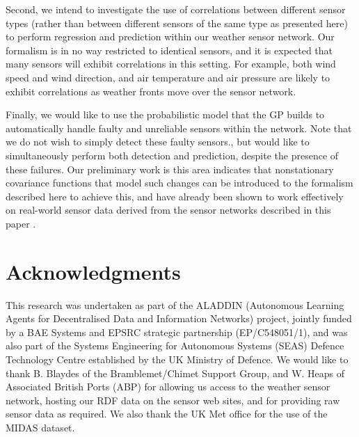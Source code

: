 \documentclass{acmsmall}
\begin{document}
Second, we intend to investigate the use of correlations between different sensor types (rather than between different sensors of the same type as presented here) to perform regression and prediction within our weather sensor network. Our formalism is in no way restricted to identical sensors, and it is expected that many sensors will exhibit correlations in this setting. For example, both wind speed and wind direction, and air temperature and air pressure are likely to exhibit correlations as weather fronts move over the sensor network.

Finally, we would like to use the probabilistic model that the GP builds to automatically handle faulty and unreliable sensors within the network. Note that we do not wish to simply detect these faulty sensors., but would like to simultaneously perform both detection and prediction, despite the presence of these failures. Our preliminary work is this area indicates that nonstationary covariance functions that model such changes can be introduced to the formalism described here to achieve this, and have already been shown to work effectively on real-world sensor data derived from the sensor networks described in this paper \cite{changepoint}.

\section*{Acknowledgments}

\noindent This research was undertaken as part of the ALADDIN (Autonomous Learning Agents for Decentralised Data and Information Networks) project, jointly funded by a BAE Systems and EPSRC strategic partnership (EP/C548051/1), and was also part of the Systems Engineering for Autonomous Systems (SEAS) Defence Technology Centre established by the UK Ministry of Defence. We would like to thank B. Blaydes of the Bramblemet/Chimet Support Group, and W. Heaps of Associated British Ports (ABP) for allowing us access to the weather sensor network, hosting our RDF data on the sensor web sites, and for providing raw sensor data as required. We also thank the UK Met office for the use of
the MIDAS dataset.

 


\end{document}
